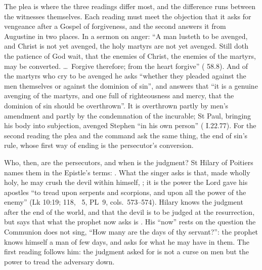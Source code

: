 The plea  is where the three
readings differ most, and the difference runs between the witnesses themselves.
Each reading must meet the objection that it asks for vengeance after a Gospel
of forgiveness, and the second answers it from Augustine in two places. In a sermon on anger: ``A man
lusteth to be avenged, and Christ is not yet avenged, the holy martyrs are not yet
avenged. Still doth the patience of God wait, that the enemies of Christ, the
enemies of the martyrs, may be converted. \dots\ Forgive therefore; from the heart
forgive'' ( 58.8). And of the martyrs who cry to be avenged he asks
``whether they pleaded against the men themselves or against the dominion of
sin'', and answers that ``it is a genuine avenging of the martyrs, and one full of
righteousness and mercy, that the dominion of sin should be overthrown''. It is
overthrown partly by men's amendment and partly by the condemnation of the
incurable; St Paul, bringing his body into subjection, avenged Stephen ``in his
own person'' ( I.22.77). For the second reading
the plea and the command ask the same thing, the end of sin's rule, whose first
way of ending is the persecutor's conversion.

Who, then, are the persecutors, and when is the judgment? St Hilary of Poitiers
names them in the Epistle's terms: . What the singer asks is that,
made wholly holy, he may crush the devil within himself, ; it is the power the Lord gave his apostles ``to tread upon serpents
and scorpions, and upon all the power of the enemy'' (Lk 10:19;  118, ~5, PL~9, cols.~573--574). Hilary knows the
judgment after the end of the world, and that the devil is to be judged at the
resurrection, but says that what the prophet now asks is . His ``now'' rests on the
question the Communion does not sing, ``How many are the days of thy
servant?'': the prophet knows himself a man of few days, and asks for what he may
have in them. The first reading follows him: the judgment asked for is not a
curse on men but the power to tread the adversary down.

